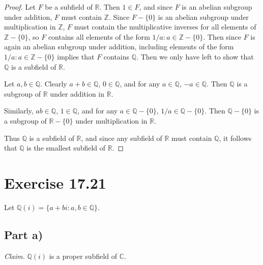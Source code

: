\documentclass{abrice}
\newcommand{\Z}{\mathbb{Z}}
\newcommand{\R}{\mathbb{R}}
\newcommand{\Q}{\mathbb{Q}}
\renewcommand{\C}{\mathbb{C}}
\begin{document}
\begin{proof}
  Let $F$ be a subfield of $\R$. Then $1 \in F$, and since $F$ is an abelian
  subgroup under addition, $F$ must contain $\Z$. Since $F - \{0\}$ is an
  abelian subgroup under multiplication in $\Z$, $F$ must contain the
  multiplicative inverses for all elements of $\Z - \{0\}$, so $F$ contains all
  elements of the form $1/a : a \in \Z - \{0\}$. Then since $F$ is again an
  abelian subgroup under addition, including elements of the form $1/a : a \in
  \Z - \{0\}$ implies that $F$ contains $\Q$. Then we only have left to show
  that $\Q$ is a subfield of $\R$.

  Let $a,b \in \Q$. Clearly $a + b \in \Q$, $0 \in \Q$, and for any $a \in \Q$, $-a
  \in \Q$. Then $\Q$ is a subgroup of $\R$ under addition in $\R$.

  Similarly, $ab \in \Q$, $1 \in \Q$, and for any $a \in \Q - \{0\}$, $1/a \in
  \Q - \{0\}$. Then $\Q - \{0\}$ is a subgroup of $\R - \{0\}$ under
  multiplication in $\R$.

  Thus $\Q$ is a subfield of $\R$, and since any subfield of $\R$ must contain
  $\Q$, it follows that $\Q$ is the smallest subfield of $\R$.
\end{proof}

\section{Exercise 17.21}

Let $\Q(i) = \{a + bi : a,b \in \Q \}$.

\subsection{Part a)}

\emph{Claim.} $\Q(i)$ is a proper subfield of $\C$.
\end{document}
